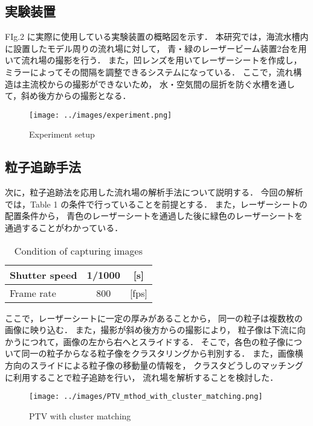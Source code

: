 \documentclass[twocolumn,a4j]{jsarticle}
\begin{document}
\subsection{実験装置}

FIg.2 に実際に使用している実験装置の概略図を示す．
本研究では，海流水槽内に設置したモデル周りの流れ場に対して，
青・緑のレーザービーム装置2台を用いて流れ場の撮影を行う．
また，凹レンズを用いてレーザーシートを作成し，
ミラーによってその間隔を調整できるシステムになっている．
ここで，流れ構造は主流校からの撮影ができないため，
水・空気間の屈折を防ぐ水槽を通して，斜め後方からの撮影となる．

\begin{figure}[htbp]
	\centering
	\texttt{[image: ../images/experiment.png]}
	\caption{Experiment setup}
\end{figure}

\newpage
\subsection{粒子追跡手法}
次に，粒子追跡法を応用した流れ場の解析手法について説明する．
今回の解析では，Table 1 の条件で行っていることを前提とする．
また，レーザーシートの配置条件から，
青色のレーザーシートを通過した後に緑色のレーザーシートを通過することがわかっている．
\begin{table}[hbtp]
	\centering
	\caption{Condition of capturing images}
	\begin{tabular}{l c c}
		\hline
		Shutter speed & 1/1000 & [s]   \\ \hline
		Frame rate    & 800    & [fps] \\ \hline
	\end{tabular}
\end{table}

ここで，レーザーシートに一定の厚みがあることから，
同一の粒子は複数枚の画像に映り込む．
また，撮影が斜め後方からの撮影により，
粒子像は下流に向かうにつれて，画像の左から右へとスライドする．
そこで，各色の粒子像について同一の粒子からなる粒子像をクラスタリングから判別する．
また，画像横方向のスライドによる粒子像の移動量の情報を，
クラスタどうしのマッチングに利用することで粒子追跡を行い，
流れ場を解析することを検討した．

\begin{figure}[htbp]
	\centering
	\texttt{[image: ../images/PTV\_mthod\_with\_cluster\_matching.png]}
	\caption{PTV with cluster matching}
\end{figure}
\end{document}
